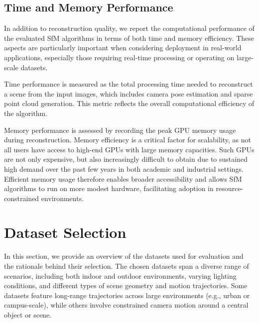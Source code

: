 

\subsection{Time and Memory Performance}
In addition to reconstruction quality, we report the computational performance of the evaluated SfM algorithms in terms of both time and memory efficiency. 
These aspects are particularly important when considering deployment in real-world applications, especially those requiring real-time processing or operating on large-scale datasets.

Time performance is measured as the total processing time needed to reconstruct a scene from the input images, which includes camera pose estimation and sparse point cloud generation. 
This metric reflects the overall computational efficiency of the algorithm.

Memory performance is assessed by recording the peak GPU memory usage during reconstruction. Memory efficiency is a critical factor for scalability, as not all users have access to high-end GPUs with large memory capacities. 
Such GPUs are not only expensive, but also increasingly difficult to obtain due to sustained high demand over the past few years in both academic and industrial settings. 
Efficient memory usage therefore enables broader accessibility and allows SfM algorithms to run on more modest hardware, facilitating adoption in resource-constrained environments.


\section{Dataset Selection}\label{sec:dataset-selection}

In this section, we provide an overview of the datasets used for evaluation and the rationale behind their selection.
The chosen datasets span a diverse range of scenarios, including both indoor and outdoor environments, varying lighting conditions, and different types of scene geometry and motion trajectories.
Some datasets feature long-range trajectories across large environments (e.g., urban or campus-scale), while others involve constrained camera motion around a central object or scene.

